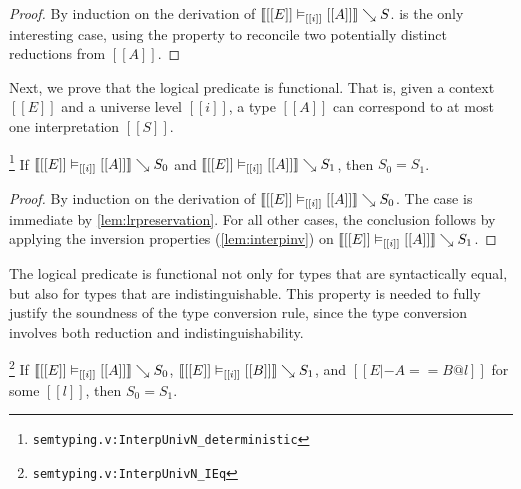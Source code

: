 \documentclass[acmsmall, screen=true, nonacm=true,
  review=\ifpublic false\else true\fi,
  anonymous=\ifanonymous true\else false\fi
]{acmart}
\DeclarePairedDelimiter{\bracks}{\llbracket}{\rrbracket}
\newcommand{\suppl}[3]{{\scriptsize\texttt{#2:#3}}}
\newcommand{\interp}[4]{\bracks{#1 \vDash_{#2} #3} \searrow #4}
\newlength{\punctwidth}
\newcommand{\stack}[1]{%
  \settowidth{\punctwidth}{#1}%
  \hspace*{-\the\punctwidth}%
}
\begin{document}
\begin{proof}
  By induction on the derivation of
  $\interp{[[E]]}{[[i]]}{[[A]]}{S}$.
   is the only interesting case,
  using the  property
  to reconcile two potentially distinct reductions
  from $[[A]]$.
\end{proof}

Next, we prove that the logical predicate is functional. That is,
given a context $[[E]]$ and a universe level $[[i]]$, a type $[[A]]$
can correspond to at most one interpretation $[[S]]$.

\begin{lemma}[Functionality]
\stack{.~}\footnote{\suppl{theories}{semtyping.v}{InterpUnivN\_deterministic}}
\label{lem:lrfunc}
If $\interp{[[E]]}{[[i]]}{[[A]]}{S_0}$ and
$\interp{[[E]]}{[[i]]}{[[A]]}{S_1}$, then $S_0 = S_1$.
\end{lemma}

\begin{proof}
  By induction on the derivation of
  $\interp{[[E]]}{[[i]]}{[[A]]}{S_0}$.
  The  case is immediate by \cref{lem:lrpreservation}.
  For all other cases, the conclusion
  follows by applying the inversion
  properties (\cref{lem:interpinv}) on
  $\interp{[[E]]}{[[i]]}{[[A]]}{S_1}$.
\end{proof}

The logical predicate is functional not only for types that are
syntactically equal, but also for types that are
indistinguishable. This property is needed to fully justify the
soundness of the type conversion rule, since the type conversion
involves both reduction and indistinguishability.

\begin{lemma}
  \label{lem:lrfunci}
  \stack{.~}\footnote{\suppl{theories}{semtyping.v}{InterpUnivN\_IEq}}
  If $\interp{[[E]]}{[[i]]}{[[A]]}{S_0}$,
  $\interp{[[E]]}{[[i]]}{[[B]]}{S_1}$, and
  $[[E |- A == B @ l ]]$ for some $[[l]]$,
  then $S_0 = S_1$.
\end{lemma}
\end{document}
